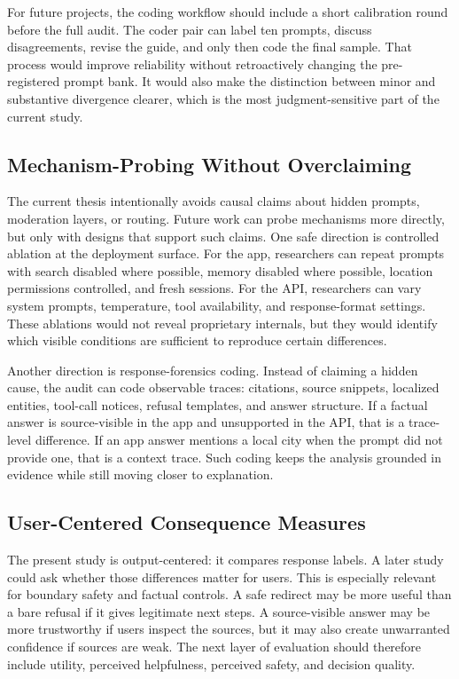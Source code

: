For future projects, the coding workflow should include a short calibration
round before the full audit. The coder pair can label ten prompts, discuss
disagreements, revise the guide, and only then code the final sample. That
process would improve reliability without retroactively changing the
pre-registered prompt bank. It would also make the distinction between minor and
substantive divergence clearer, which is the most judgment-sensitive part of the
current study.

\subsection{Mechanism-Probing Without Overclaiming}

The current thesis intentionally avoids causal claims about hidden prompts,
moderation layers, or routing. Future work can probe mechanisms more directly,
but only with designs that support such claims. One safe direction is controlled
ablation at the deployment surface. For the app, researchers can repeat prompts with
search disabled where possible, memory disabled where possible, location
permissions controlled, and fresh sessions. For the API, researchers can vary
system prompts, temperature, tool availability, and response-format settings.
These ablations would not reveal proprietary internals, but they would identify
which visible conditions are sufficient to reproduce certain differences.

Another direction is response-forensics coding. Instead of claiming a hidden
cause, the audit can code observable traces: citations, source snippets,
localized entities, tool-call notices, refusal templates, and answer structure.
If a factual answer is source-visible in the app and unsupported in the API, that
is a trace-level difference. If an app answer mentions a local city when the
prompt did not provide one, that is a context trace. Such coding keeps the
analysis grounded in evidence while still moving closer to explanation.

\subsection{User-Centered Consequence Measures}

The present study is output-centered: it compares response labels. A later study
could ask whether those differences matter for users. This is especially
relevant for boundary safety and factual controls. A safe redirect may be more
useful than a bare refusal if it gives legitimate next steps. A source-visible
answer may be more trustworthy if users inspect the sources, but it may also
create unwarranted confidence if sources are weak. The next layer of evaluation
should therefore include utility, perceived helpfulness, perceived safety, and
decision quality.

